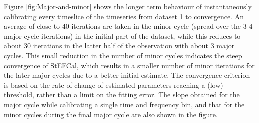 \documentclass{aa}
\begin{document}


Figure   \ref{fig:Major-and-minor}   shows   the   longer  term   behaviour   of
instantaneously calibrating every timeslice of  the timeseries from dataset 1 to
convergence. An average  of close to 40 iterations are taken  in the minor cycle
(spread over the 3-4 major cycle iterations) in the initial part of the dataset,
while this reduces to about 30  iterations in the latter half of the observation
with about  3 major cycles. This small  reduction in the number  of minor cycles
indicates the steep convergence of StEFCal, which results in a smaller number of
minor  iterations  for   the  later  major  cycles  due   to  a  better  initial
estimate. The convergence criterion is based  on the rate of change of estimated
parameters  reaching a  (low)  threshold, rather  than  a limit  on the  fitting
error. The  slope obtained for the  major cycle while calibrating  a single time
and frequency  bin, and that for the  minor cycles during the  final major cycle
are also shown in the figure.
\end{document}
